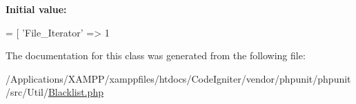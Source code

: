 {\bfseries Initial value\+:}
\begin{DoxyCode}
= [
        \textcolor{stringliteral}{'File\_Iterator'}                               => 1
\end{DoxyCode}


The documentation for this class was generated from the following file\+:\begin{DoxyCompactItemize}
\item 
/\+Applications/\+X\+A\+M\+P\+P/xamppfiles/htdocs/\+Code\+Igniter/vendor/phpunit/phpunit/src/\+Util/\mbox{\hyperlink{phpunit_2phpunit_2src_2_util_2_blacklist_8php}{Blacklist.\+php}}\end{DoxyCompactItemize}
